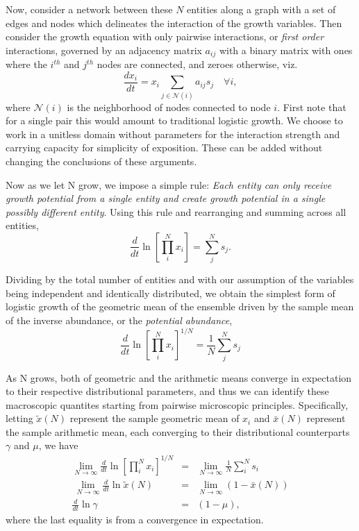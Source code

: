 \documentclass{article}
\begin{document}
Now, consider a network between these $N$ entities along a graph with a set of edges and nodes which delineates the interaction of the growth variables. Then consider the growth equation with only pairwise interactions, or \textit{first order} interactions, governed by an adjacency matrix ${a_{ij}}$ with a binary matrix with ones where the $i^{th}$ and $j^{th}$ nodes are connected, and zeroes otherwise, viz.
\begin{equation}
\label{eq:modSIR}
\frac{d x_i}{dt} = x_i\sum_{j \in \mathcal{N}(i)}{a_{ij}}s_{j} \quad \forall i,
\end{equation}
where $\mathcal{N}(i)$ is the neighborhood of nodes connected to node $i$.
First note that for a single pair this would amount to traditional logistic growth. We choose to work in a unitless domain without parameters for the interaction strength and carrying capacity for simplicity of exposition. These can be added without changing the conclusions of these arguments. 

Now as we let N grow, we impose a simple rule: \textit{Each entity can only receive growth potential from a single entity and create growth potential in a single possibly different entity}. Using this rule and rearranging and summing across all entities,
\begin{equation}
\label{eq:modSIR2}
\frac{d}{dt} \ln \left[ \prod_i^N x_i \right ] = \sum_j^N s_{j}.
\end{equation}

Dividing by the total number of entities and with our assumption of the variables being independent and identically distributed, we obtain the simplest form of logistic growth of the geometric mean of the ensemble driven by the sample mean of the inverse abundance, or the \textit{potential abundance}, 
\begin{equation}
\label{eq:modSIR3}
\frac{d}{dt} \ln \left[ \prod_i^N x_i \right ]^{1/N} = \frac{1}{N}\sum_j^N s_j 
\end{equation}

As N grows, both of geometric and the arithmetic means converge in expectation to their respective distributional parameters, and thus we can identify these macroscopic quantites starting from pairwise microscopic principles. Specifically, letting $\tilde{x}(N)$ represent the sample geometric mean of $x_i$ and $\bar{x}(N)$ represent the sample arithmetic mean, each converging to their distributional counterparts $\gamma$ and $\mu$, we have 
\begin{eqnarray*}
  \lim_{N\rightarrow \infty} \frac{d}{dt} \ln \left[ \prod_i^N x_i \right ]^{1/N} &=& \lim_{N\rightarrow \infty} \frac{1}{N}\sum_i^N s_i \\\
  \lim_{N\rightarrow \infty} \frac{d}{dt} \ln \tilde{x}(N) &=& \lim_{N\rightarrow \infty}(1 - \bar{x}(N)) \\
  \frac{d}{dt} \ln \gamma &=&(1 - \mu),
\end{eqnarray*}
where the last equality is from a convergence in expectation.
\end{document}
